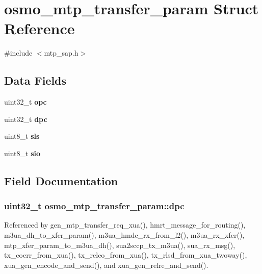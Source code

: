 \section{osmo\+\_\+mtp\+\_\+transfer\+\_\+param Struct Reference}
\label{structosmo__mtp__transfer__param}


{\ttfamily \#include $<$mtp\+\_\+sap.\+h$>$}

\subsection*{Data Fields}
\begin{DoxyCompactItemize}
\item 
uint32\+\_\+t {\bf opc}
\item 
uint32\+\_\+t {\bf dpc}
\item 
uint8\+\_\+t {\bf sls}
\item 
uint8\+\_\+t {\bf sio}
\end{DoxyCompactItemize}


\subsection{Field Documentation}
\subsubsection[{dpc}]{\setlength{\rightskip}{0pt plus 5cm}uint32\+\_\+t osmo\+\_\+mtp\+\_\+transfer\+\_\+param\+::dpc}\label{structosmo__mtp__transfer__param_a33af7172cd176c790cbbdc8baa0d6374}


Referenced by gen\+\_\+mtp\+\_\+transfer\+\_\+req\+\_\+xua(), hmrt\+\_\+message\+\_\+for\+\_\+routing(), m3ua\+\_\+dh\+\_\+to\+\_\+xfer\+\_\+param(), m3ua\+\_\+hmdc\+\_\+rx\+\_\+from\+\_\+l2(), m3ua\+\_\+rx\+\_\+xfer(), mtp\+\_\+xfer\+\_\+param\+\_\+to\+\_\+m3ua\+\_\+dh(), sua2sccp\+\_\+tx\+\_\+m3ua(), sua\+\_\+rx\+\_\+msg(), tx\+\_\+coerr\+\_\+from\+\_\+xua(), tx\+\_\+relco\+\_\+from\+\_\+xua(), tx\+\_\+rlsd\+\_\+from\+\_\+xua\+\_\+twoway(), xua\+\_\+gen\+\_\+encode\+\_\+and\+\_\+send(), and xua\+\_\+gen\+\_\+relre\+\_\+and\+\_\+send().

